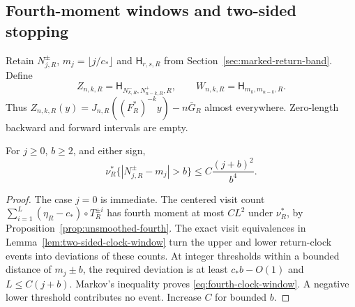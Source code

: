 \subsection{Fourth-moment windows and two-sided stopping}
Retain $N^\pm_{j,R}$, $m_j=\lfloor j/c_*\rfloor$ and
$\mathsf H_{r,s,R}$ from Section~\ref{sec:marked-return-band}. Define
\begin{equation}\label{eq:moment-stopped-pair}
 Z_{n,k,R}=\mathsf H_{N^-_{k,R},N^+_{n-k,R},R},\qquad
 W_{n,k,R}=\mathsf H_{m_k,m_{n-k},R}.
\end{equation}
Thus $Z_{n,k,R}(y)=J_{n,R}((F_R^*)^{-k}y)-n\bar G_R$ almost
everywhere. Zero-length backward and forward intervals are empty.

\begin{lemma}
\label{lem:fourth-clock-window}
For $j\ge0$, $b\ge2$, and either sign,
\begin{equation}\label{eq:fourth-clock-window}
 \nu_R^*\{|N^\pm_{j,R}-m_j|>b\}
       \le C\frac{(j+b)^2}{b^4}.
\end{equation}
\end{lemma}
\begin{proof}
The case $j=0$ is immediate. The centered visit count
$\sum_{i=1}^L(\eta_R-c_*)\circ T_R^{\pm i}$ has fourth moment at
most $CL^2$ under $\nu_R^*$, by
Proposition~\ref{prop:unsmoothed-fourth}. The exact visit equivalences
in Lemma~\ref{lem:two-sided-clock-window} turn the upper and lower
return-clock events into deviations of these counts. At integer
thresholds within a bounded distance of $m_j\pm b$, the required
deviation is at least $c_*b-O(1)$ and $L\le C(j+b)$. Markov's
inequality proves \eqref{eq:fourth-clock-window}. A negative lower
threshold contributes no event. Increase $C$ for bounded $b$.
\end{proof}

